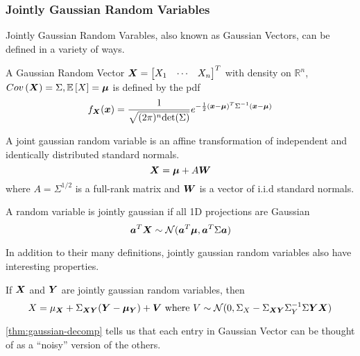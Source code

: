 \subsubsection{Jointly Gaussian Random Variables}
Jointly Gaussian Random Varables, also known as Gaussian Vectors, can be defined in a variety of ways.
\begin{definition}
	A Gaussian Random Vector $\boldsymbol{X} = \begin{bmatrix} X_1 & \cdots & X_n \end{bmatrix}^T$ with density on $\mathbb{R}^n$, $Cov\left(\boldsymbol{X}\right)=\Sigma, \mathbb{E}\left[X\right]=\boldsymbol{\mu}$ is defined by the pdf
	\[
		f_{\boldsymbol{X}}(\boldsymbol{x}) = \frac{1}{\sqrt{(2\pi)^n\text{det}(\Sigma)}}e^{-\frac{1}{2}(\boldsymbol{x}-\boldsymbol{\mu})^T\Sigma^{-1}(\boldsymbol{x}-\boldsymbol{\mu})}
	\]
	\label{defn:joint-gaussian-1}
\end{definition}
\begin{definition}
		A joint gaussian random variable is an affine transformation of independent and identically distributed standard normals.
		\[
			\boldsymbol{X} = \boldsymbol{\mu}+A\boldsymbol{W}
		\] where $A=\Sigma^{1/2}$ is a full-rank matrix and $\boldsymbol{W}$ is a vector of i.i.d standard normals.
	\label{defn:joint-gaussian-2}
\end{definition}
\begin{definition}
	A random variable is jointly gaussian if all 1D projections are Gaussian
	\[
		\boldsymbol{a}^T\boldsymbol{X} \sim \mathcal{N}(\boldsymbol{a}^T\boldsymbol{\mu}, \boldsymbol{a}^T\Sigma\boldsymbol{a})
	\]
	\label{defn:joint-gaussian-3}
\end{definition}
In addition to their many definitions, jointly gaussian random variables also have interesting properties.
\begin{theorem}
	If $\boldsymbol{X}$ and $\boldsymbol{Y}$ are jointly gaussian random variables, then \[
		X = \mu_{\boldsymbol{X}}+\Sigma_{\boldsymbol{XY}}(\boldsymbol{Y} - \boldsymbol{\mu_Y}) + \boldsymbol{V} \text{ where } V \sim \mathcal{N}(0, \Sigma_X-\Sigma_{\boldsymbol{XY}}\Sigma_Y^{-1}\Sigma{\boldsymbol{YX}})
	\]
	\label{thm:gaussian-decomp}
\end{theorem}
\cref{thm:gaussian-decomp} tells us that each entry in Gaussian Vector can be thought of as a ``noisy'' version of the others.
